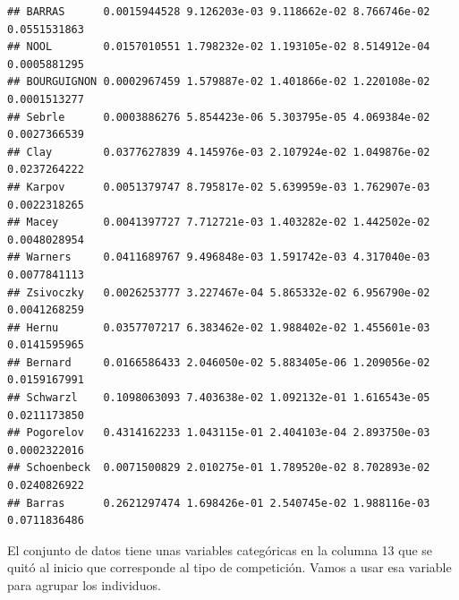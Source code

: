 \documentclass[
]{book}
\newenvironment{Shaded}{\begin{snugshade}}{\end{snugshade}}
\newcommand{\AttributeTok}[1]{\textcolor[rgb]{0.13,0.29,0.53}{#1}}
\newcommand{\CommentTok}[1]{\textcolor[rgb]{0.56,0.35,0.01}{\textit{#1}}}
\newcommand{\ConstantTok}[1]{\textcolor[rgb]{0.56,0.35,0.01}{#1}}
\newcommand{\DecValTok}[1]{\textcolor[rgb]{0.00,0.00,0.81}{#1}}
\newcommand{\FloatTok}[1]{\textcolor[rgb]{0.00,0.00,0.81}{#1}}
\newcommand{\FunctionTok}[1]{\textcolor[rgb]{0.13,0.29,0.53}{\textbf{#1}}}
\newcommand{\NormalTok}[1]{#1}
\newcommand{\OtherTok}[1]{\textcolor[rgb]{0.56,0.35,0.01}{#1}}
\newcommand{\SpecialCharTok}[1]{\textcolor[rgb]{0.81,0.36,0.00}{\textbf{#1}}}
\newcommand{\StringTok}[1]{\textcolor[rgb]{0.31,0.60,0.02}{#1}}
\begin{document}
\begin{verbatim}
## BARRAS      0.0015944528 9.126203e-03 9.118662e-02 8.766746e-02 0.0551531863
## NOOL        0.0157010551 1.798232e-02 1.193105e-02 8.514912e-04 0.0005881295
## BOURGUIGNON 0.0002967459 1.579887e-02 1.401866e-02 1.220108e-02 0.0001513277
## Sebrle      0.0003886276 5.854423e-06 5.303795e-05 4.069384e-02 0.0027366539
## Clay        0.0377627839 4.145976e-03 2.107924e-02 1.049876e-02 0.0237264222
## Karpov      0.0051379747 8.795817e-02 5.639959e-03 1.762907e-03 0.0022318265
## Macey       0.0041397727 7.712721e-03 1.403282e-02 1.442502e-02 0.0048028954
## Warners     0.0411689767 9.496848e-03 1.591742e-03 4.317040e-03 0.0077841113
## Zsivoczky   0.0026253777 3.227467e-04 5.865332e-02 6.956790e-02 0.0041268259
## Hernu       0.0357707217 6.383462e-02 1.988402e-02 1.455601e-03 0.0141595965
## Bernard     0.0166586433 2.046050e-02 5.883405e-06 1.209056e-02 0.0159167991
## Schwarzl    0.1098063093 7.403638e-02 1.092132e-01 1.616543e-05 0.0211173850
## Pogorelov   0.4314162233 1.043115e-01 2.404103e-04 2.893750e-03 0.0002322016
## Schoenbeck  0.0071500829 2.010275e-01 1.789520e-02 8.702893e-02 0.0240826922
## Barras      0.2621297474 1.698426e-01 2.540745e-02 1.988116e-03 0.0711836486
\end{verbatim}

El conjunto de datos tiene unas variables categóricas en la columna 13 que se quitó al inicio que corresponde al tipo de competición. Vamos a usar esa variable para agrupar los individuos.

\begin{Shaded}
\end{Shaded}
\end{document}
